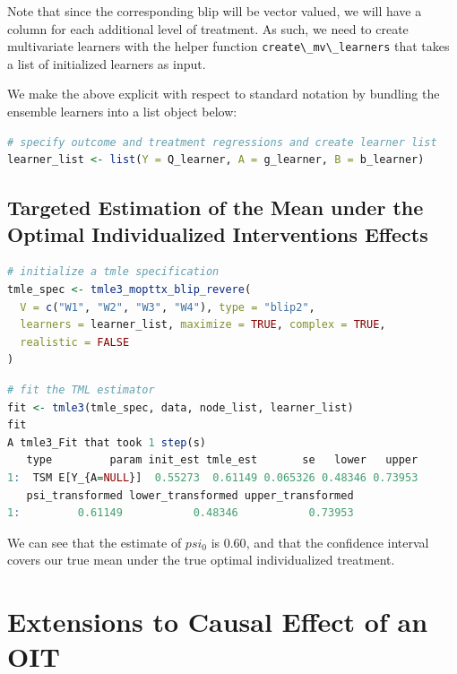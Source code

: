\documentclass[12pt, krantz2,]{krantz}
\newcommand{\passthrough}[1]{#1}
\theoremstyle{definition}
\theoremstyle{definition}
\theoremstyle{definition}
\newcommand{\1}{\mathbbm{1}}
\begin{document}
Note that since the corresponding blip will be vector valued, we will have a
column for each additional level of treatment. As such, we need to create
multivariate learners with the helper function \passthrough{\lstinline!create\_mv\_learners!} that takes a
list of initialized learners as input.

We make the above explicit with respect to standard notation by bundling the
ensemble learners into a list object below:

\begin{lstlisting}[language=R]
# specify outcome and treatment regressions and create learner list
learner_list <- list(Y = Q_learner, A = g_learner, B = b_learner)
\end{lstlisting}

\hypertarget{targeted-estimation-of-the-mean-under-the-optimal-individualized-interventions-effects-1}{%
\subsection{Targeted Estimation of the Mean under the Optimal Individualized Interventions Effects}\label{targeted-estimation-of-the-mean-under-the-optimal-individualized-interventions-effects-1}}

\begin{lstlisting}[language=R]
# initialize a tmle specification
tmle_spec <- tmle3_mopttx_blip_revere(
  V = c("W1", "W2", "W3", "W4"), type = "blip2",
  learners = learner_list, maximize = TRUE, complex = TRUE,
  realistic = FALSE
)
\end{lstlisting}

\begin{lstlisting}[language=R]
# fit the TML estimator
fit <- tmle3(tmle_spec, data, node_list, learner_list)
fit
A tmle3_Fit that took 1 step(s)
   type         param init_est tmle_est       se   lower   upper
1:  TSM E[Y_{A=NULL}]  0.55273  0.61149 0.065326 0.48346 0.73953
   psi_transformed lower_transformed upper_transformed
1:         0.61149           0.48346           0.73953
\end{lstlisting}

We can see that the estimate of \(psi_0\) is \(0.60\), and that the confidence
interval covers our true mean under the true optimal individualized treatment.

\hypertarget{extensions-to-causal-effect-of-an-oit}{%
\section{Extensions to Causal Effect of an OIT}\label{extensions-to-causal-effect-of-an-oit}}
\end{document}
